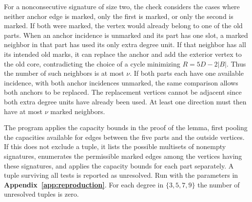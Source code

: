 For a nonconsecutive signature of size two, the check considers
the cases where neither anchor edge is marked, only the first is
marked, or only the second is marked. If both were marked, the
vertex would already belong to one of the old parts.
When an anchor incidence is unmarked and its part has one slot, a
marked neighbor in that part has used its only extra degree unit.
If that neighbor has all its intended old marks, it can replace the
anchor and add the exterior vertex to the old core, contradicting the
choice of a cycle minimizing $R=5D-2|B|$. Thus the number of such neighbors is at most
$\nu$. If both parts each have one available incidence, with both anchor incidences unmarked,
the same comparison allows both anchors to be replaced. The replacement vertices
cannot be adjacent since both extra degree units have already been used.
At least one direction must then have at most $\nu$ marked neighbors.

The program applies the capacity bounds in the proof of the lemma,
first pooling the capacities available for edges between the five
parts and the outside vertices. If this does not exclude a tuple,
it lists the possible multisets of nonempty signatures, enumerates
the permissible marked edges among the vertices having these
signatures, and applies the capacity bounds for each part separately.
A tuple surviving all tests is reported as unresolved. Run
 with the parameters in
\textbf{Appendix~\ref{app:reproduction}}. For each degree in
$\{3,5,7,9\}$ the number of unresolved tuples is zero.
